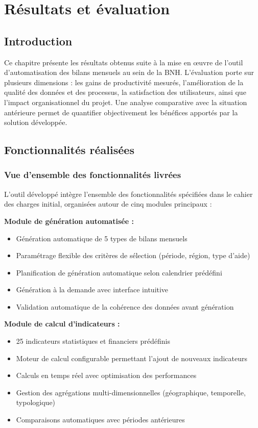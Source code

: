 \chapter{Résultats et évaluation}
\clearpage
\label{chap:resultats}

\section{Introduction}

Ce chapitre présente les résultats obtenus suite à la mise en œuvre de l'outil d'automatisation des bilans mensuels au sein de la BNH. L'évaluation porte sur plusieurs dimensions : les gains de productivité mesurés, l'amélioration de la qualité des données et des processus, la satisfaction des utilisateurs, ainsi que l'impact organisationnel du projet. Une analyse comparative avec la situation antérieure permet de quantifier objectivement les bénéfices apportés par la solution développée.

\section{Fonctionnalités réalisées}

\subsection{Vue d'ensemble des fonctionnalités livrées}

L'outil développé intègre l'ensemble des fonctionnalités spécifiées dans le cahier des charges initial, organisées autour de cinq modules principaux :

\medskip

\textbf{Module de génération automatisée :}
\begin{itemize}
    \item Génération automatique de 5 types de bilans mensuels
    \item Paramétrage flexible des critères de sélection (période, région, type d'aide)
    \item Planification de génération automatique selon calendrier prédéfini
    \item Génération à la demande avec interface intuitive
    \item Validation automatique de la cohérence des données avant génération
\end{itemize}

\textbf{Module de calcul d'indicateurs :}
\begin{itemize}
    \item 25 indicateurs statistiques et financiers prédéfinis
    \item Moteur de calcul configurable permettant l'ajout de nouveaux indicateurs
    \item Calculs en temps réel avec optimisation des performances
    \item Gestion des agrégations multi-dimensionnelles (géographique, temporelle, typologique)
    \item Comparaisons automatiques avec périodes antérieures
\end{itemize}

